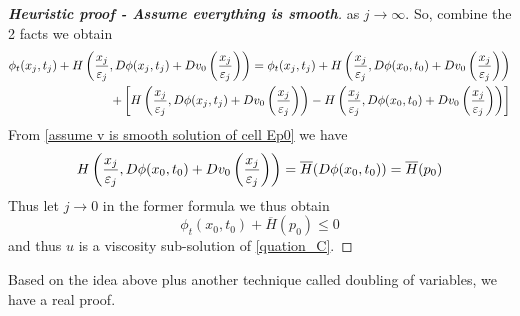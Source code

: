 \documentclass[12pt, oneside]{amsart}  	%
\begin{document}
\begin{proof}[\textbf{Heuristic proof - Assume everything is smooth}]
as $j\longrightarrow\infty$. So, combine the 2 facts we obtain
\begin{align*}
\phi_t(x_j, t_j) + H\left(\frac{x_j}{\varepsilon_j}, D\phi(x_j, t_j) + Dv_0\left(\frac{x_j}{\varepsilon_j}\right)\right) = \phi_t(x_j, t_j) + H\left(\frac{x_j}{\varepsilon_j}, D\phi(x_0, t_0) + Dv_0\left(\frac{x_j}{\varepsilon_j}\right)\right)\\
+ \left[H\left(\frac{x_j}{\varepsilon_j}, D\phi(x_j, t_j) + Dv_0\left(\frac{x_j}{\varepsilon_j}\right)\right)-H\left(\frac{x_j}{\varepsilon_j}, D\phi(x_0, t_0) + Dv_0\left(\frac{x_j}{\varepsilon_j}\right)\right)\right]
\end{align*}
From \eqref{assume v is smooth solution of cell Ep0} we have
\begin{equation*}
H\left(\frac{x_j}{\varepsilon_j}, D\phi(x_0, t_0) + Dv_0\left(\frac{x_j}{\varepsilon_j}\right)\right) = \overline{H}(D\phi(x_0,t_0)) = \overline{H}(p_0)
\end{equation*}
Thus let $j\longrightarrow 0$ in the former formula we thus obtain 
\begin{equation*}
\phi_t(x_0, t_0) + \overline{H}(p_0)\le 0
\end{equation*}
and thus $u$ is a viscosity sub-solution of \eqref{quation_C}.
\end{proof}



Based on the idea above plus another technique called doubling of variables, we have a real proof.
\end{document}
